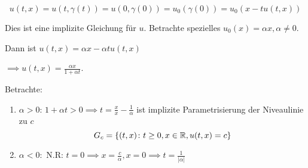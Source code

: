 $$
u(t,x) = u(t, \gamma(t)) = u(0, \gamma(0)) = u_0(\gamma(0)) = u_0(x - tu(t,x))
$$

\begin{bem}
  Dies ist eine implizite Gleichung für $u$.
  Betrachte spezielles $u_0(x) = \alpha x, \alpha \neq 0$.

  Dann ist $u(t,x) = \alpha x - \alpha t u(t,x)$

  $\implies u(t,x) = \frac{\alpha x}{1 + \alpha t}$.

  Betrachte: 

  \begin{enumerate}[1)]
    \item $\alpha > 0$: $1 + \alpha t > 0 \implies t = \frac{x}{x} - \frac{1}{\alpha}$ ist implizite Parametrisierung der Niveaulinie zu $c$
      $$G_c = \{(t,x) \colon t \geq 0, x \in \mathbb{R}, u(t,x) = c\}$$

    \item $\alpha < 0: $ N.R: $ t = 0 \implies x = \frac{c}{\alpha}, x = 0 \implies t = \frac{1}{|\alpha|}$

  \end{enumerate}

\end{bem}
